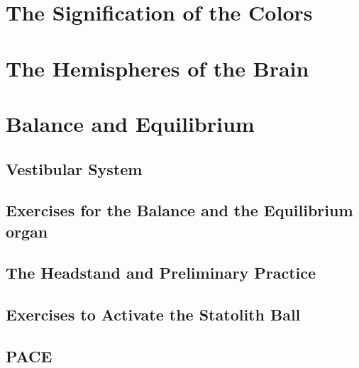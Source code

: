 \documentclass[../main.tex]{subfiles}
\begin{document}




\chapter{The Signification of the Colors}



\chapter{The Hemispheres of the Brain}



\chapter{Balance and Equilibrium}



\section{Vestibular System}



\newpage
\section[Balance Exercises]{Exercises for the Balance and the Equilibrium organ}



\section[Headstand]{The Headstand and Preliminary Practice}



\section{Exercises to Activate the Statolith Ball}



\section{PACE}


\end{document}
